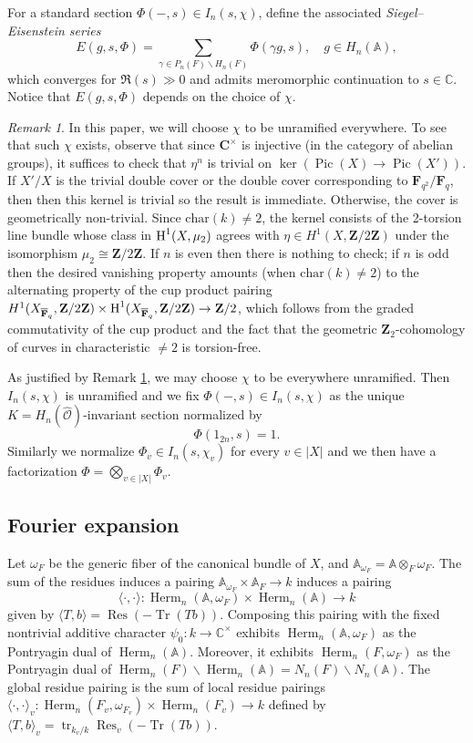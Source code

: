 \documentclass[reqno]{amsart}
\numberwithin{equation}{section}
\newcommand{\BA}{\ensuremath{\mathbb{A}}\xspace}
\newcommand{\BC}{\ensuremath{\mathbb{C}}\xspace}
\newcommand{\F}{\mathbf{F}}
\newcommand{\CC}{\mathbf{C}}
\newcommand{\tr}[0]{\operatorname{tr}}
\newcommand{\Z}{\mathbf{Z}}
\newcommand{\ol}[1]{\overline{#1}}
\newcommand{\wh}[1]{\widehat{#1}}
\newcommand{\mrm}[1]{\mathrm{#1}}
\newcommand{\bs}{\backslash}
\DeclareMathOperator{\Tr}{Tr}
\DeclareMathOperator{\Res}{Res}
\DeclareMathOperator{\Pic}{Pic}
\DeclareMathOperator{\Herm}{Herm}
\renewcommand{\j}[1]{\langle{#1}\rangle}
\newcommand\ot{\otimes}
\newcommand{\cohog}[2]{\textup{H}^{#1}({#2})}     %
\newcommand{\om}{\omega}
\newcommand\cO{\mathcal{O}}
\theoremstyle{remark}
\newtheorem{remark}[thm]{Remark}
\numberwithin{equation}{section}
\begin{document}
For a standard section $\Phi(-, s)\in I_n(s,\chi)$, define the associated \emph{Siegel--Eisenstein series} 
$$E(g,s, \Phi)= \sum_{\gamma\in P_n(F)\backslash H_n(F)}\Phi(\gamma g, s),\quad g\in H_n(\BA),
$$ which converges for $\Re(s)\gg 0$ and admits meromorphic continuation to $s\in \mathbb{C}$. Notice that $E(g,s,\Phi)$ depends on the choice of $\chi$. 


\begin{remark}\label{rem: chi exists}
In this paper, we will choose $\chi$ to be unramified everywhere. To see that such $\chi$ exists, observe that since $\CC^{\times}$ is injective (in the category of abelian groups), it suffices to check that $\eta^n$ is trivial on $\ker (\Pic(X) \rightarrow \Pic(X') )$. If $X'/X$ is the trivial double cover or the double cover corresponding to $\F_{q^2}/\F_q$, then then this kernel is trivial so the result is immediate. Otherwise, the cover is geometrically non-trivial. Since $\mrm{char}(k) \neq 2$, the kernel consists of the 2-torsion line bundle whose class in $\cohog{1}{X, \mu_2}$ agrees with $\eta \in H^1(X, \Z/2\Z)$ under the isomorphism $\mu_2 \cong \Z/2\Z$. If $n$ is even then there is nothing to check; if $n$ is odd then the desired vanishing property amounts (when $\mrm{char}(k) \neq 2$) to the alternating property of the cup product pairing $H^1(X_{\ol{\F}_q},\Z/2\Z)\times \cohog{1}{X_{\ol{\F}_q},\Z/2\Z}\to \Z/2$, which follows from the graded commutativity of the cup product and the fact that the geometric $\Z_2$-cohomology of curves in characteristic $\neq 2$ is torsion-free.
\end{remark}


As justified by Remark \ref{rem: chi exists}, we may choose $\chi$ to be everywhere unramified. Then  $I_n(s,\chi)$ is unramified and we fix $\Phi(-, s)\in I_n(s,\chi)$  as the unique $K=H_n(\wh\cO)$-invariant section normalized by
$$
\Phi(1_{2n}, s)=1.
$$
Similarly we normalize $\Phi_v \in I_n(s,\chi_v)$ for every $v\in|X|$ and we then have a factorization $\Phi=\bigotimes_{v\in|X|}\Phi_v$.

 
\subsection{Fourier expansion} 
Let $\om_{F}$ be the generic fiber of the canonical bundle of $X$, and $\BA_{\om_{F}}=\BA\ot_{F}\om_{F}$. The sum of the residues induces a pairing $\BA_{\om_{F}}\times \BA_{F}\to k$ induces a pairing  
$$\j{\cdot,\cdot}: \Herm_{n}(\BA, \om_{F})\times \Herm_{n}(\BA)\to k$$
given by $\j{T,b}=\Res(-\Tr(Tb))$. Composing this pairing with the fixed nontrivial additive character $\psi_{0}: k\to \BC^\times$  exhibits $\Herm_{n}(\BA,\om_{F})$ as the Pontryagin dual of $\Herm_{n}(\BA)$. Moreover, it exhibits $\Herm_{n}(F,\om_{F})$ as the Pontryagin dual of $\Herm_{n}(F)\bs \Herm_{n}(\BA)=N_{n}(F)\bs N_{n}(\BA)$. The global residue pairing is the sum of local residue pairings $\j{\cdot,\cdot}_{v}: \Herm_{n}(F_{v}, \om_{F_v})\times \Herm_{n}(F_{v})\to k$ defined by $\j{T,b}_{v}=\tr_{k_v/k}\Res_{v}(-\Tr(Tb))$.
\end{document}
